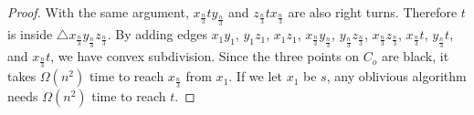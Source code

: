 \documentclass [letterpaper] {patmorin}
\begin{document}
\begin{proof}
With the same argument, $x_{\frac{n}{3}}ty_{\frac{n}{3}}$ and $z_{\frac{n}{3}}tx_{\frac{n}{3}}$ are also right turns. Therefore $t$ is inside $\triangle x_{\frac{n}{3}}y_{\frac{n}{3}}z_{\frac{n}{3}}$. By adding edges $x_{1}y_{1}$, $y_{1}z_{1}$, $x_{1}z_{1}$, $x_{\frac{n}{3}}y_{\frac{n}{3}}$, $y_{\frac{n}{3}}z_{\frac{n}{3}}$, $x_{\frac{n}{3}}z_{\frac{n}{3}}$, $x_{\frac{n}{3}}t$, $y_{\frac{n}{3}}t$, and $x_{\frac{n}{3}}t$, we have convex subdivision. Since the three points on $C_{o}$ are black, it takes  $\Omega (n^{2})$ time to reach $x_{\frac{n}{3}}$ from $x_{1}$. If we let $x_{1}$ be $s$, any oblivious algorithm needs $\Omega (n^{2})$ time to reach $t$.



\end{proof}







\end{document}
